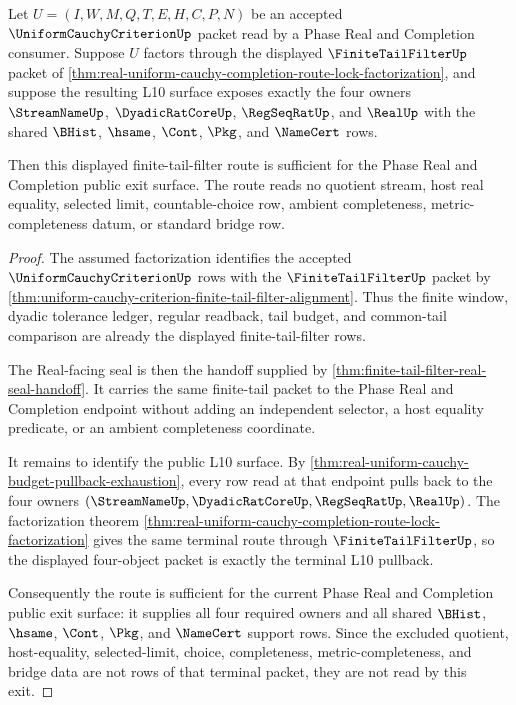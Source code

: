 \begin{theorem}
\label{thm:real-uniform-cauchy-finite-tail-filter-l10-exit-sufficiency}
Let $U=(I,W,M,Q,T,E,H,C,P,N)$ be an accepted
$\UniformCauchyCriterionUp$ packet read by a Phase Real and Completion
consumer. Suppose $U$ factors through the displayed $\FiniteTailFilterUp$
packet of
\autoref{thm:real-uniform-cauchy-completion-route-lock-factorization}, and
suppose the resulting L10 surface exposes exactly the four owners
$\StreamNameUp$, $\DyadicRatCoreUp$, $\RegSeqRatUp$, and $\RealUp$ with the
shared $\BHist$, $\hsame$, $\Cont$, $\Pkg$, and $\NameCert$ rows.

Then this displayed finite-tail-filter route is sufficient for the Phase Real
and Completion public exit surface. The route reads no quotient stream, host
real equality, selected limit, countable-choice row, ambient completeness,
metric-completeness datum, or standard bridge row.
\end{theorem}
\begin{proof}
The assumed factorization identifies the accepted
$\UniformCauchyCriterionUp$ rows with the $\FiniteTailFilterUp$ packet by
\autoref{thm:uniform-cauchy-criterion-finite-tail-filter-alignment}. Thus the
finite window, dyadic tolerance ledger, regular readback, tail budget, and
common-tail comparison are already the displayed finite-tail-filter rows.

The Real-facing seal is then the handoff supplied by
\autoref{thm:finite-tail-filter-real-seal-handoff}. It carries the same
finite-tail packet to the Phase Real and Completion endpoint without adding an
independent selector, a host equality predicate, or an ambient completeness
coordinate.

It remains to identify the public L10 surface. By
\autoref{thm:real-uniform-cauchy-budget-pullback-exhaustion}, every row read at
that endpoint pulls back to the four owners
$(\StreamNameUp,\DyadicRatCoreUp,\RegSeqRatUp,\RealUp)$. The factorization
theorem
\autoref{thm:real-uniform-cauchy-completion-route-lock-factorization} gives
the same terminal route through $\FiniteTailFilterUp$, so the displayed
four-object packet is exactly the terminal L10 pullback.

Consequently the route is sufficient for the current Phase Real and Completion
public exit surface: it supplies all four required owners and all shared
$\BHist$, $\hsame$, $\Cont$, $\Pkg$, and $\NameCert$ support rows. Since the
excluded quotient, host-equality, selected-limit, choice, completeness,
metric-completeness, and bridge data are not rows of that terminal packet, they
are not read by this exit.
\end{proof}

